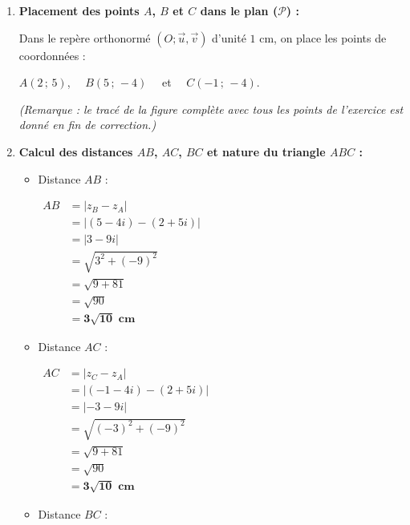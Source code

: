 \documentclass[12pt,a4paper]{article}
\newcounter{exercice}
\begin{document}
\begin{enumerate}
    \item \textbf{Placement des points $A$, $B$ et $C$ dans le plan ($\mathcal{P}$) :}
    
    Dans le repère orthonormé $(O; \vec{u}, \vec{v})$ d'unité $1\text{ cm}$, on place les points de coordonnées :
    
    $A(2\,;\,5)$, $\quad B(5\,;\,-4) \quad$ et $\quad C(-1\,;\,-4)$.
    
    \textit{(Remarque : le tracé de la figure complète avec tous les points de l'exercice est donné en fin de correction.)}

    \item \textbf{Calcul des distances $AB$, $AC$, $BC$ et nature du triangle $ABC$ :}
    
    \begin{itemize}
        \item Distance $AB$ :
        
        $
        \begin{aligned}
            AB &= |z_B - z_A|\\
            &= |(5 - 4i) - (2 + 5i)|\\
            &= |3 - 9i|\\
            &= \sqrt{3^2 + (-9)^2}\\
            &= \sqrt{9 + 81}\\
            &= \sqrt{90}\\
            &= \mathbf{3\sqrt{10}\text{ cm}}
        \end{aligned}
        $
        
        \item Distance $AC$ :
        
        $
        \begin{aligned}
            AC &= |z_C - z_A|\\
            &= |(-1 - 4i) - (2 + 5i)|\\
            &= |-3 - 9i|\\
            &= \sqrt{(-3)^2 + (-9)^2}\\
            &= \sqrt{9 + 81}\\
            &= \sqrt{90}\\
            &= \mathbf{3\sqrt{10}\text{ cm}}
        \end{aligned}
        $
        
        \item Distance $BC$ :
        

\end{itemize}
\end{enumerate}
\end{document}
